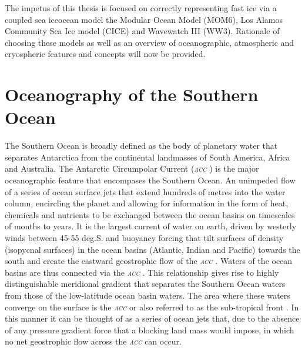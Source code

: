\documentclass[11pt,a4paper]{article}
\newcommand{\acc}{\textit{\textsc{{acc }}}} %
\newcommand{\fastice}{fast ice }
\begin{document}
The impetus of this thesis is focused on correctly representing
\fastice via a coupled sea ice\textendash ocean model \textemdash the
Modular Ocean Model (MOM6), Los Alamos Community Sea Ice model (CICE)
\citep{hunkeSeaiceModelsClimate2010,hunkeCICEAlamosSea2010} and
Wavewatch III (WW3). Rationale of choosing these models as well as an
overview of oceanographic, atmospheric and cryospheric
features and concepts will now be provided.

\section{Oceanography of the Southern Ocean}
\label{sec:orgcee67ef}

The Southern Ocean is broadly defined as the body of planetary water
that separates Antarctica from the continental landmasses of South
America, Africa and Australia. The Antarctic Circumpolar Current
(\acc) is the major oceanographic feature that encompases the Southern
Ocean. An unimpeded flow of a series of ocean surface jets that
extend hundreds of metres into the water column, encircling the
planet and allowing for information in the form of heat, chemicals and
nutrients to be exchanged between the ocean basins on timescales of
months to years. It is the largest current of
water on earth, driven by westerly winds between 45-55 deg.S. and
buoyancy forcing that tilt surfaces of density (isopycnal surfaces) in
the ocean basins (Atlantic, Indian and Pacific) towards the south and create the eastward geostrophic
flow of the \acc. Waters of the ocean basins are thus connected via
the \acc\citep{orsiMeridionalExtentFronts1995}. This relationship gives rise to highly distinguishable meridional
gradient that separates the Southern Ocean waters from those of the
low-latitude ocean basin waters. The area where these waters converge
on the surface is the \acc or also referred to as the sub-tropical
front \citep{orsiCoolingVentilatingAbyssal2001}. In this manner it can be
thought of as a series of ocean jets that, due to the absence of any
pressure gradient force that a blocking land mass would impose, in
which no net geostrophic flow across the \acc can occur.
\end{document}
